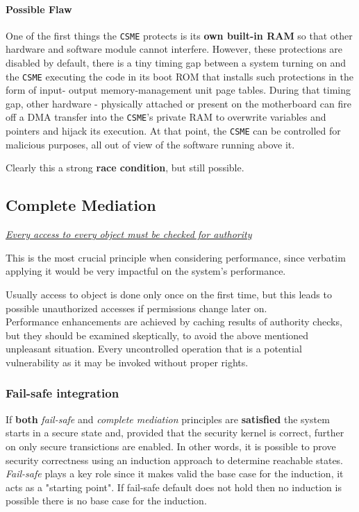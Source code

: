 \paragraph{Possible Flaw}
One of the first things the \texttt{CSME} protects is its \textbf{own built-in RAM} so that other hardware and software module cannot interfere.
However, these protections are disabled by default, there is a tiny timing gap between a system turning on and the \texttt{CSME} executing the code
in its boot ROM that installs such protections in the form of input-
output memory-management unit page tables.
During that timing gap, other hardware - physically attached or
present on the motherboard can fire off a DMA transfer into the
\texttt{CSME}’s private RAM to overwrite variables and pointers and hijack
its execution. 
At that point, the \texttt{CSME} can be controlled for
malicious purposes, all out of view of the software running above it.

Clearly this a strong \textbf{race condition}, but still possible.

\subsection{Complete Mediation}
\begin{center}
   \textit{\ul{Every access to every object must be checked for authority}}
\end{center}

This is the most crucial principle when considering performance,
since verbatim applying it would be very impactful on the system's performance.

Usually access to object is done only once on the first time,
but this leads to possible unauthorized accesses if permissions change later on.\\
Performance enhancements are achieved by caching results of
authority checks,
but they should be examined skeptically,
to avoid the above mentioned unpleasant situation.
Every uncontrolled operation that is a potential vulnerability as it may be invoked without proper rights.

\subsubsection{Fail-safe integration}
If \textbf{both} \textit{fail-safe} and \textit{complete mediation} principles are \textbf{satisfied} the system starts in a secure state and,
provided that the security kernel is correct, further on only secure transictions are enabled.
In other words, it is possible to prove security correctness using an induction approach to determine reachable states.\\
\textit{Fail-safe} plays a key role since it makes valid the base case for the induction, it acts as a "starting point".
If fail-safe default does not hold then no induction is possible
there is no base case for the induction.

